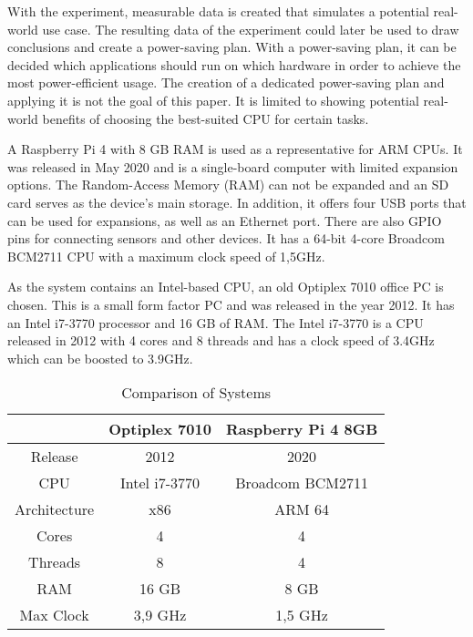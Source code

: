 With the experiment, measurable data is created that simulates a potential real-world use case. 
The resulting data of the experiment could later be used to draw conclusions and create a power-saving plan. 
With a power-saving plan, it can be decided which applications should run on which hardware in order to achieve the most power-efficient usage.
The creation of a dedicated power-saving plan and applying it is not the goal of this paper. 
It is limited to showing potential real-world benefits of choosing the best-suited CPU for certain tasks.


A Raspberry Pi 4 with 8 GB RAM is used as a representative for ARM CPUs.
It was released in May 2020 and is a single-board computer with 
limited expansion options.
The Random-Access Memory (RAM) can not be expanded and an SD card 
serves as the device's main storage.  
In addition, it offers four USB ports that can be used for expansions,
as well as an Ethernet port. 
There are also GPIO pins for connecting sensors and other devices.
It has a 64-bit 4-core Broadcom BCM2711 CPU with a maximum clock speed of 1,5GHz.
\cite{Raspberr44:online}

As the system contains an Intel-based CPU, an old Optiplex 7010 office PC is chosen.
This is a small form factor PC and was released in the year 2012. 
It has an Intel i7-3770 processor and 16 GB of RAM.
The Intel i7-3770 is a CPU released in 2012 with 4 cores and 8 threads
and has a clock speed of 3.4GHz which can be boosted to 3.9GHz.
\cite{IntelCor68:online}


\begin{table} [h!]
\centering
\caption{Comparison of Systems}
\begin{tabular}{| c | c | c |}
\hline
                    & Optiplex 7010             & Raspberry Pi 4 8GB                \\      \hline
Release             & 2012                      & 2020                              \\
CPU                 & Intel i7-3770             & Broadcom BCM2711                  \\    
Architecture        & x86                       & ARM 64                            \\ 
Cores               & 4                         & 4                                 \\    
Threads             & 8                         & 4                                 \\    
RAM                 & 16 GB                     & 8 GB                              \\    
Max Clock           & 3,9 GHz                   & 1,5 GHz                           \\      \hline
\end{tabular}
\end{table}

